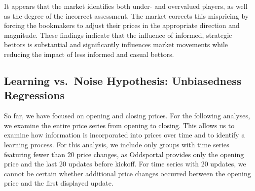 \documentclass[webpdf,modern,medium]{oup-authoring-template}
\theoremstyle{thmstyleone}%
\theoremstyle{thmstyletwo}%
\theoremstyle{thmstylethree}%
\begin{document}
	    It appears that the market identifies both under- and overvalued players, as well as the degree of the incorrect assessment. The market corrects this mispricing by forcing the bookmakers to adjust their prices in the appropriate direction and magnitude. These findings indicate that the influence of informed, strategic bettors is substantial and significantly influences market movements while reducing the impact of less informed and casual bettors.

    \subsection{Learning vs.\ Noise Hypothesis: Unbiasedness Regressions}

        So far, we have focused on opening and closing prices. For the following analyses, we examine the entire price series from opening to closing. This allows us to examine how information is incorporated into prices over time and to identify a learning process. For this analysis, we include only groups with time series featuring fewer than 20 price changes, as Oddsportal provides only the opening price and the last 20 updates before kickoff. For time series with 20 updates, we cannot be certain whether additional price changes occurred between the opening price and the first displayed update.
\end{document}
